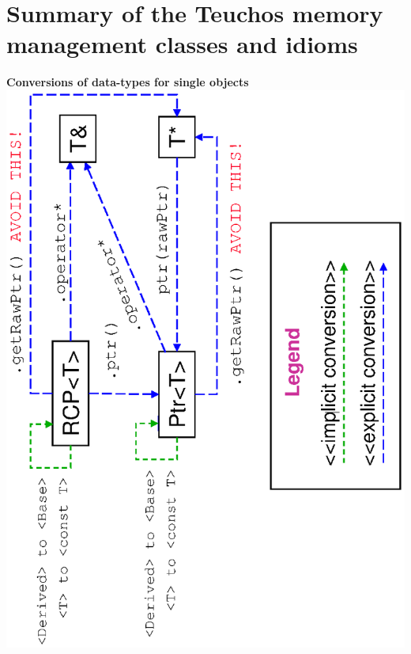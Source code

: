 \documentclass[pdf,ps2pdf,11pt]{SANDreport}
\begin{document}
%
{}\section{Summary of the Teuchos memory management classes and
idioms}
\label{apdx:summary_of_idioms}
%

\begin{center}















\pagebreak



\pagebreak



\pagebreak





\pagebreak

{}\textbf{Conversions of data-types for single objects}
\includegraphics*[angle=270,scale=0.65]{TeuchosPtrConversions} \\[5ex]


\end{center}
\end{document}
